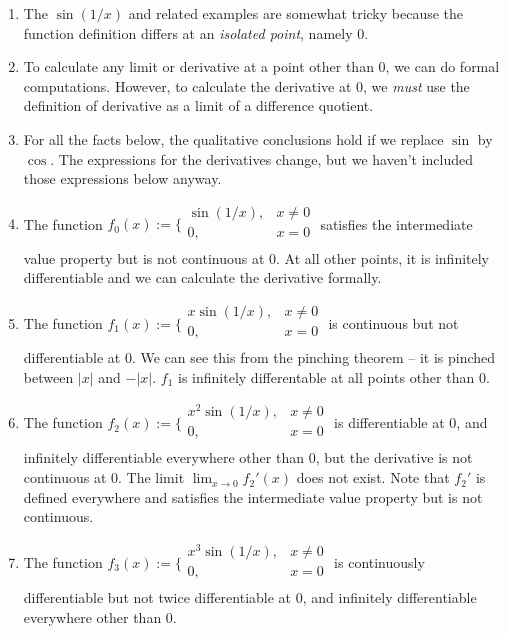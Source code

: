 \documentclass[10pt]{amsart}
\begin{document}
\begin{enumerate}
\item The $\sin(1/x)$ and related examples are somewhat tricky because
  the function definition differs at an {\em isolated point}, namely $0$.
\item To calculate any limit or derivative at a point other than $0$,
  we can do formal computations. However, to calculate the derivative
  at $0$, we {\em must} use the definition of derivative as a limit of
  a difference quotient.
\item For all the facts below, the qualitative conclusions hold if we
  replace $\sin$ by $\cos$. The expressions for the derivatives
  change, but we haven't included those expressions below anyway.
\item The function $f_0(x) := \lbrace \begin{array}{rl} \sin(1/x), & x
  \ne 0 \\ 0, & x = 0 \\\end{array}$ satisfies the intermediate value
  property but is not continuous at $0$. At all other points, it is
  infinitely differentiable and we can calculate the derivative
  formally.
\item The function $f_1(x) := \lbrace \begin{array}{rl} x\sin(1/x), &
  x \ne 0 \\ 0, & x = 0 \\\end{array}$ is continuous but not
  differentiable at $0$. We can see this from the pinching theorem --
  it is pinched between $|x|$ and $-|x|$. $f_1$ is infinitely
  differentable at all points other than $0$.
\item The function $f_2(x) := \lbrace \begin{array}{rl} x^2\sin(1/x), &
  x \ne 0 \\ 0, & x = 0 \\\end{array}$ is differentiable at $0$, and
  infinitely differentiable everywhere other than $0$, but the
  derivative is not continuous at $0$. The limit $\lim_{x \to 0}
  f_2'(x)$ does not exist. Note that $f_2'$ is defined everywhere and
  satisfies the intermediate value property but is not continuous.
\item The function $f_3(x) := \lbrace \begin{array}{rl} x^3\sin(1/x),
  & x \ne 0 \\ 0, & x = 0 \\\end{array}$ is continuously
  differentiable but not twice differentiable at $0$, and infinitely
  differentiable everywhere other than $0$.
\end{enumerate}
\end{document}
